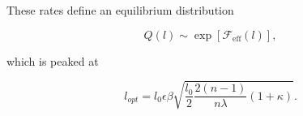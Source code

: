 \documentclass[10pt,a4paper]{article}
\begin{document}
\noindent These rates define an equilibrium distribution 

\begin{equation}
	Q(l) \sim \exp\left[ \mathcal{F}_\mathrm{eff}(l) \right],
\end{equation}

\noindent which is peaked at 

\begin{equation}
	l_{opt} = l_0\epsilon\beta\sqrt{\frac{l_0}{2}\frac{2(n-1)}{n\lambda}(1+\kappa)}.
\end{equation}


\end{document}
